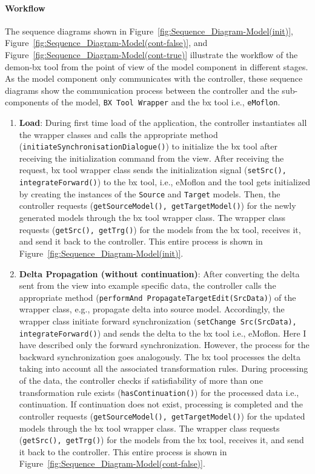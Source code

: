 \paragraph{Workflow}
The sequence diagrams shown in Figure~\ref{fig:Sequence_Diagram-Model(init)}, Figure~\ref{fig:Sequence_Diagram-Model(cont-false)}, and Figure~\ref{fig:Sequence_Diagram-Model(cont-true)} illustrate the workflow of the demon-bx tool from the point of view of the model component in different stages. As the model component only communicates with the controller, these sequence diagrams show the communication process between the controller and the sub-components of the model, \texttt{BX Tool Wrapper} and the bx tool i.e., \texttt{eMoflon}.
\begin{enumerate}
	\item {\textbf{Load}: During first time load of the application, the controller instantiates all the wrapper classes and calls the appropriate method (\texttt{initiateSynchronisationDialogue()}) to initialize the bx tool after receiving the initialization command from the view. After receiving the request, bx tool wrapper class sends the initialization signal (\texttt{setSrc(), integrateForward()}) to the bx tool, i.e., eMoflon and the tool gets initialized by creating the instances of the \texttt{Source} and \texttt{Target} models. Then, the controller requests (\texttt{getSourceModel(), getTargetModel()}) for the newly generated models through the bx tool wrapper class. The wrapper class requests (\texttt{getSrc(), getTrg()}) for the models from the bx tool, receives it, and send it back to the controller. This entire process is shown in Figure~\ref{fig:Sequence_Diagram-Model(init)}.}
	
	\item {\textbf{Delta Propagation (without continuation)}: After converting the delta sent from the view into example specific data, the controller calls the appropriate method (\texttt{performAnd PropagateTargetEdit(SrcData)}) of the wrapper class, e.g., propagate delta into source model. Accordingly, the wrapper class initiate forward synchronization 
	(\texttt{setChange Src(SrcData), integrateForward()}) and sends the delta to the bx tool i.e., eMoflon. Here I have described only the forward synchronization. However, the process for the backward synchronization goes analogously. The bx tool processes the delta taking into account all the associated transformation rules. During processing of the data, the controller checks if satisfiability of more than one transformation rule exists (\texttt{hasContinuation()}) for the processed data i.e., continuation. If continuation does not exist, processing is completed and the controller requests (\texttt{getSourceModel(), getTargetModel()}) for the updated models through the bx tool wrapper class. The wrapper class requests (\texttt{getSrc(), getTrg()}) for the models from the bx tool, receives it, and send it back to the controller. This entire process is shown in Figure~\ref{fig:Sequence_Diagram-Model(cont-false)}.}
	

\end{enumerate}
